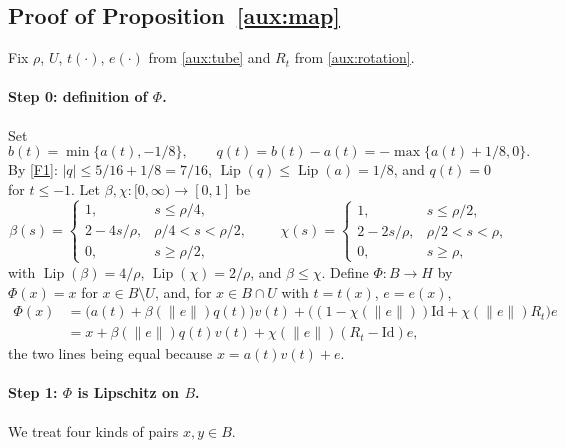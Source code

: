 \documentclass[11pt]{article}
\newcommand{\norm}[1]{\lVert #1\rVert}
\DeclareMathOperator{\Lip}{Lip}
\theoremstyle{definition}
\numberwithin{equation}{section}
\begin{document}
\subsection{Proof of Proposition~\ref{aux:map}}

Fix \(\rho\), \(U\), \(t(\cdot)\), \(e(\cdot)\) from \cref{aux:tube} and
\(R_t\) from \cref{aux:rotation}.

\paragraph{Step 0: definition of \(\Phi\).}
Set
\[
 b(t)=\min\{a(t),-1/8\},\qquad
 q(t)=b(t)-a(t)=-\max\{a(t)+1/8,0\}.
\]
By \ref{F1}: \(|q|\le5/16+1/8=7/16\), \(\Lip(q)\le\Lip(a)=1/8\), and
\(q(t)=0\) for \(t\le-1\). Let \(\beta,\chi:[0,\infty)\to[0,1]\) be
\[
 \beta(s)=
 \begin{cases}
 1,&s\le\rho/4,\\
 2-4s/\rho,&\rho/4<s<\rho/2,\\
 0,&s\ge\rho/2,
 \end{cases}
 \qquad
 \chi(s)=
 \begin{cases}
 1,&s\le\rho/2,\\
 2-2s/\rho,&\rho/2<s<\rho,\\
 0,&s\ge\rho,
 \end{cases}
\]
with \(\Lip(\beta)=4/\rho\), \(\Lip(\chi)=2/\rho\), and \(\beta\le\chi\).
Define \(\Phi:B\to H\) by \(\Phi(x)=x\) for \(x\in B\setminus U\), and, for
\(x\in B\cap U\) with \(t=t(x)\), \(e=e(x)\),
\begin{equation}\label{aux:G}
 \begin{split}
 \Phi(x)&=\bigl(a(t)+\beta(\norm e)q(t)\bigr)v(t)
       +\bigl((1-\chi(\norm e))\mathrm{Id}+\chi(\norm e)R_t\bigr)e\\
 &=x+\beta(\norm e)q(t)v(t)+\chi(\norm e)(R_t-\mathrm{Id})e ,
 \end{split}
\end{equation}
the two lines being equal because \(x=a(t)v(t)+e\).

\paragraph{Step 1: \(\Phi\) is Lipschitz on \(B\).}
We treat four kinds of pairs \(x,y\in B\).
\end{document}
